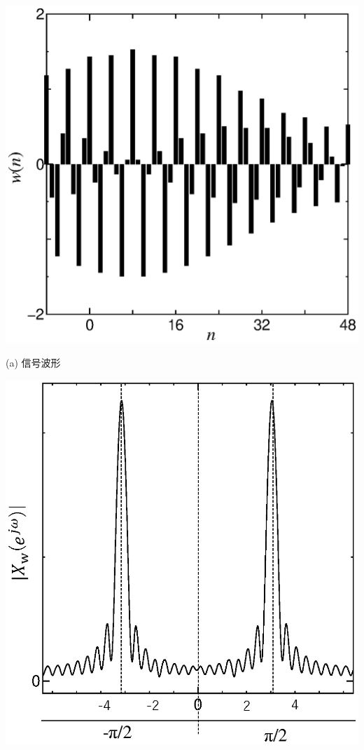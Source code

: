 \begin{center}
\begin{minipage}{.35\textwidth}
\begin{center}
\includegraphics[width=.98\textwidth]{fig/zu-5-14-a.eps}

(a) 信号波形
\end{center}
\end{minipage}
\begin{minipage}{.35\textwidth}
\begin{center}
\includegraphics[width=.98\textwidth]{fig/zu-5-14-b.eps}


\end{center}
\end{minipage}
\end{center}
